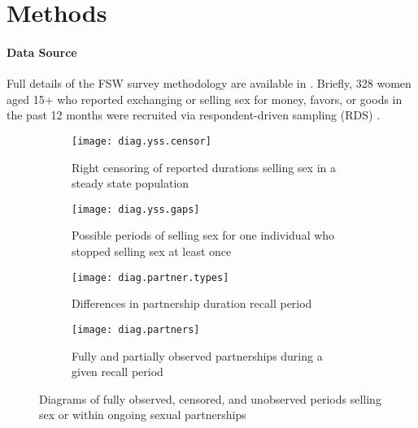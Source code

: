 \section{Methods}\label{meth}
\paragraph{Data Source}
Full details of the FSW survey methodology are available in \cite{Yam2013}.
Briefly, 328 women aged 15+
who reported exchanging or selling sex for money, favors, or goods in the past 12 months
were recruited via respondent-driven sampling (RDS) \cite{Heckathorn1997}.   
\begin{figure}
  \begin{subfigure}[b]{\textwidth}
    \centering\texttt{[image: diag.yss.censor]}
    \caption{Right censoring of reported durations selling sex in a steady state population}
    \label{fig:diag.yss.censor}
  \end{subfigure}
  \begin{subfigure}[b]{\textwidth}
    \centering\texttt{[image: diag.yss.gaps]}
    \caption{Possible periods of selling sex for one individual who stopped selling sex at least once}
    \label{fig:diag.yss.gaps}
  \end{subfigure}
  \begin{subfigure}[b]{\textwidth}
    \centering\texttt{[image: diag.partner.types]}
    \caption{Differences in partnership duration \vs recall period}
    \label{fig:diag.partner.types}
  \end{subfigure}
  \begin{subfigure}[b]{\textwidth}
    \centering\texttt{[image: diag.partners]}
    \caption{Fully and partially observed partnerships during a given recall period}
    \label{fig:diag.partners}
  \end{subfigure}
  \caption{Diagrams of fully observed, censored, and unobserved periods
    selling sex or within ongoing sexual partnerships}
  \label{fig:diag}
\end{figure}
